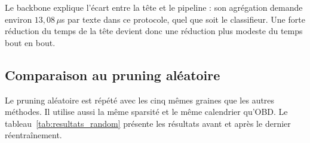 Le backbone explique l'écart entre la tête et le pipeline : son agrégation
demande environ $13{,}08\,\mu$s par texte dans ce protocole, quel que soit le
classifieur. Une forte réduction du temps de la tête devient donc une réduction
plus modeste du temps bout en bout.

\subsection{Comparaison au pruning aléatoire}
\label{ssec:resultats_random}

Le pruning aléatoire est répété avec les cinq mêmes graines que les autres
méthodes. Il utilise aussi la même sparsité et le même calendrier qu'OBD. Le
tableau~\ref{tab:resultats_random} présente les résultats avant et après le
dernier réentraînement.

\begin{table}[!htbp]
    \centering
    \caption{Métriques de test du témoin aléatoire sur cinq graines. Chaque
    valeur est la moyenne $\pm$ l'écart-type empirique. RAND-M2 et RAND-M3 ont
    exactement la sparsité et le nombre de poids actifs de leurs homologues
    OBD.}
    \label{tab:resultats_random}
\end{table}

